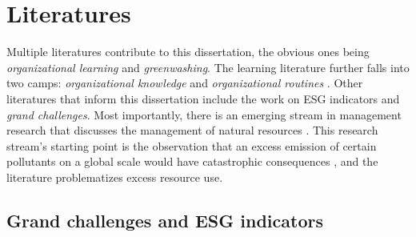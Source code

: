\section{Literatures}

Multiple literatures contribute to this dissertation, the obvious ones being \textit{organizational learning} and \textit{greenwashing}. The learning literature further falls into two camps: \textit{organizational knowledge} and \textit{organizational routines} \citep{Bingham2011}. Other literatures that inform this dissertation include the work on ESG indicators and \textit{grand challenges}. Most importantly, there is an emerging stream in management research that discusses the management of natural resources \citep{George2015}. This research stream's starting point is the observation that an excess emission of certain pollutants on a global scale would have catastrophic consequences \citep{Rockstrom2009a}, and the literature problematizes excess resource use.


\subsection{Grand challenges and ESG indicators}

